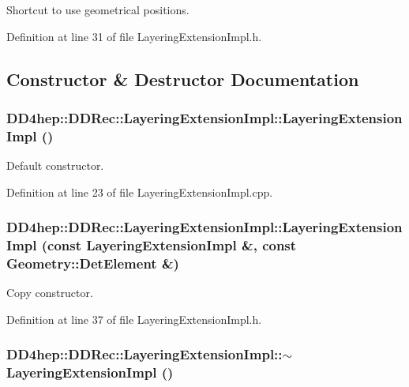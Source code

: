 Shortcut to use geometrical positions. 

Definition at line 31 of file LayeringExtensionImpl.h.

\subsection{Constructor \& Destructor Documentation}
\hypertarget{class_d_d4hep_1_1_d_d_rec_1_1_layering_extension_impl_a870512f3f48cb5ad014fbe822a50be67}{
\subsubsection[{LayeringExtensionImpl}]{\setlength{\rightskip}{0pt plus 5cm}DD4hep::DDRec::LayeringExtensionImpl::LayeringExtensionImpl ()}}
\label{class_d_d4hep_1_1_d_d_rec_1_1_layering_extension_impl_a870512f3f48cb5ad014fbe822a50be67}


Default constructor. 

Definition at line 23 of file LayeringExtensionImpl.cpp.\hypertarget{class_d_d4hep_1_1_d_d_rec_1_1_layering_extension_impl_aa8410cb9758c1ab2aeaa4a02478c3ed0}{
\subsubsection[{LayeringExtensionImpl}]{\setlength{\rightskip}{0pt plus 5cm}DD4hep::DDRec::LayeringExtensionImpl::LayeringExtensionImpl (const {\bf LayeringExtensionImpl} \&, \/  const {\bf Geometry::DetElement} \&)}}
\label{class_d_d4hep_1_1_d_d_rec_1_1_layering_extension_impl_aa8410cb9758c1ab2aeaa4a02478c3ed0}


Copy constructor. 

Definition at line 37 of file LayeringExtensionImpl.h.\hypertarget{class_d_d4hep_1_1_d_d_rec_1_1_layering_extension_impl_a12c9038ed17e445cf503abb692e87657}{
\subsubsection[{$\sim$LayeringExtensionImpl}]{\setlength{\rightskip}{0pt plus 5cm}DD4hep::DDRec::LayeringExtensionImpl::$\sim$LayeringExtensionImpl ()}}
\label{class_d_d4hep_1_1_d_d_rec_1_1_layering_extension_impl_a12c9038ed17e445cf503abb692e87657}


